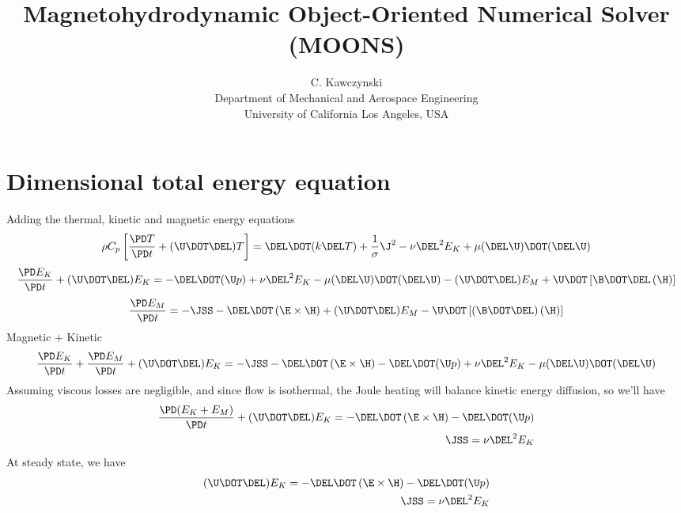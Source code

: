 \documentclass[11pt]{article}
\begin{document}
\doublespacing
\title{Magnetohydrodynamic Object-Oriented Numerical Solver (MOONS)}
\author{C. Kawczynski \\
Department of Mechanical and Aerospace Engineering \\
University of California Los Angeles, USA\\
}
\maketitle

\section{Dimensional total energy equation}
Adding the thermal, kinetic and magnetic energy equations
\begin{equation}
	\rho C_p \left[ \frac{\PD T}{\PD t}
	+ (\U \DOT \DEL) T \right]
	= \DEL \DOT (k \DEL T)
	+ \frac{1}{\sigma} \J^2
	- \nu \DEL^2 E_K
	+ \mu (\DEL \U) \DOT (\DEL \U)
\end{equation}
\begin{equation}
	\frac{\PD E_K}{\PD t} +
	(\U \DOT \DEL) E_K =
	- \DEL \DOT (\U p)
	+ \nu \DEL^2 E_K
	- \mu (\DEL \U) \DOT (\DEL \U)
	- (\U \DOT \DEL) E_M
	+ \U \DOT \left[\B \DOT \DEL \left( \H \right) \right]
\end{equation}
\begin{equation}
	\frac{\PD E_M}{\PD t} =
	- \JSS
	- \DEL \DOT \left(\E \times \H \right)
	+ (\U \DOT \DEL) E_M
	- \U \DOT \left[(\B \DOT \DEL) \left( \H \right) \right]
\end{equation}
Magnetic + Kinetic
\begin{equation}
	\frac{\PD E_K}{\PD t}
	+ \frac{\PD E_M}{\PD t}
	+ (\U \DOT \DEL) E_K =
	- \JSS
	- \DEL \DOT \left(\E \times \H \right)
	- \DEL \DOT (\U p)
	+ \nu \DEL^2 E_K
	- \mu (\DEL \U) \DOT (\DEL \U)
\end{equation}
Assuming viscous losses are negligible, and since flow is isothermal, the Joule heating will balance kinetic energy diffusion, so we'll have
\begin{equation}\begin{aligned}
	\frac{\PD (E_K + E_M)}{\PD t}
	+ (\U \DOT \DEL) E_K =
	- \DEL \DOT \left(\E \times \H \right)
	- \DEL \DOT (\U p) \\
	\JSS = \nu \DEL^2 E_K
\end{aligned}\end{equation}
At steady state, we have
\begin{equation}\begin{aligned}
	(\U \DOT \DEL) E_K =
	- \DEL \DOT \left(\E \times \H \right)
	- \DEL \DOT (\U p) \\
	\JSS = \nu \DEL^2 E_K
\end{aligned}\end{equation}
\end{document}
